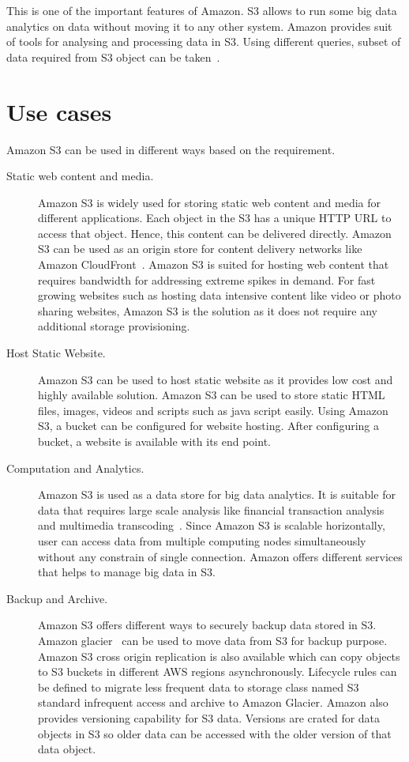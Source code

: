 This is one of the important features of Amazon. S3 allows to run some big data
analytics on data without moving it to any other system. Amazon provides suit of
tools for analysing and processing data in S3. Using different queries, subset
of data required from S3 object can be taken~\cite{hid-sp18-420-amazon-S3}.

\section{Use cases}
Amazon S3 can be used in different ways based on the requirement. 

\begin{description}
\item [Static web content and media.] Amazon S3 is widely used for storing
static web content and media for different applications. Each object in the S3
has a unique HTTP URL to access that object. Hence, this content can be
delivered directly. Amazon S3 can be used as an origin store for content
delivery networks like Amazon
CloudFront~\cite{hid-sp18-420-amazon-cloudfront}. Amazon S3 is suited for
hosting web content that requires bandwidth for addressing extreme spikes in
demand. For fast growing websites such as hosting data intensive content like
video or photo sharing websites, Amazon S3 is the solution as it does not
require any additional storage provisioning.

\item [Host Static Website.] Amazon S3 can be used to host static website as it
provides low cost and highly available solution. Amazon S3 can be used to store
static HTML files, images, videos and scripts such as java script easily. Using
Amazon S3, a bucket can be configured for website hosting. After configuring a
bucket, a website is available with its end point.


\item [Computation and Analytics.] Amazon S3 is used as a data store for big
data analytics. It is suitable for data that requires large scale analysis like
financial transaction analysis and multimedia
transcoding~\cite{hid-sp18-420-amazon-S3-FAQ}.
Since Amazon S3 is scalable horizontally, user can access data from multiple
computing nodes
simultaneously without any constrain of single connection. Amazon offers
different services that helps to manage big data in S3.


\item [Backup and Archive.] Amazon S3 offers different ways to securely backup
data stored in S3. Amazon glacier~\cite{hid-sp18-420-amazon-glacier} can be used
to move data from S3 for backup purpose. Amazon S3 cross origin replication is
also available which can copy objects to S3 buckets in different AWS regions
asynchronously. Lifecycle rules can be defined to migrate less frequent data to
storage class named S3 standard infrequent access and archive to Amazon Glacier.
Amazon also provides versioning capability for S3 data. Versions are crated for
data objects in S3 so older data can be accessed with the older version of that
data object.

\end{description}

